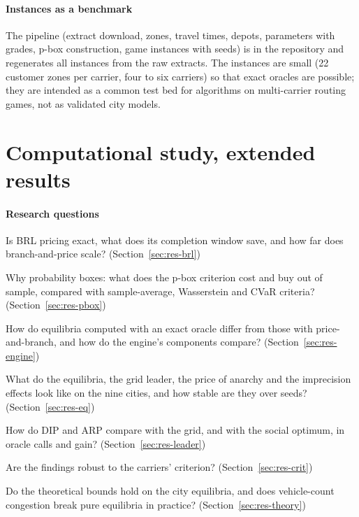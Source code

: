 \documentclass[preprint,11pt]{elsarticle}
\theoremstyle{definition}
\theoremstyle{remark}
\begin{document}
\paragraph{Instances as a benchmark} The pipeline (extract download, zones, travel times, depots, parameters with grades, p-box construction, game instances with seeds) is in the repository and regenerates all instances from the raw extracts. The instances are small (22 customer zones per carrier, four to six carriers) so that exact oracles are possible; they are intended as a common test bed for algorithms on multi-carrier routing games, not as validated city models.

\section{Computational study, extended results}\label{sec:results}

\paragraph{Research questions}
\begin{description}[itemsep=0pt]
\item[RQ1] Is BRL pricing exact, what does its completion window save, and how far does branch-and-price scale? (Section~\ref{sec:res-brl})
\item[RQ2] Why probability boxes: what does the p-box criterion cost and buy out of sample, compared with sample-average, Wasserstein and CVaR criteria? (Section~\ref{sec:res-pbox})
\item[RQ3] How do equilibria computed with an exact oracle differ from those with price-and-branch, and how do the engine's components compare? (Section~\ref{sec:res-engine})
\item[RQ4] What do the equilibria, the grid leader, the price of anarchy and the imprecision effects look like on the nine cities, and how stable are they over seeds? (Section~\ref{sec:res-eq})
\item[RQ5] How do DIP and ARP compare with the grid, and with the social optimum, in oracle calls and gain? (Section~\ref{sec:res-leader})
\item[RQ6] Are the findings robust to the carriers' criterion? (Section~\ref{sec:res-crit})
\item[RQ7] Do the theoretical bounds hold on the city equilibria, and does vehicle-count congestion break pure equilibria in practice? (Section~\ref{sec:res-theory})
\end{description}
\end{document}

